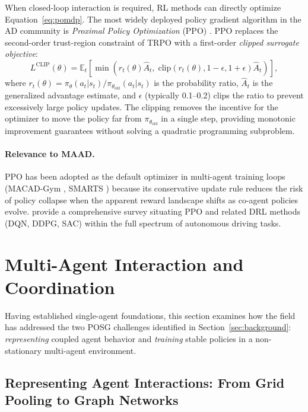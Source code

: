 \documentclass[12pt, a4paper]{article}
\begin{document}
When closed-loop interaction is required, RL methods can directly optimize
Equation~\eqref{eq:pomdp}. The most widely deployed policy gradient algorithm in
the AD community is \emph{Proximal Policy Optimization} (PPO)
\citep{schulman2017proximal}. PPO replaces the second-order trust-region
constraint of TRPO with a first-order \emph{clipped surrogate objective}:
\begin{equation}
  L^{\text{CLIP}}(\theta)
  = \mathbb{E}_t \!\left[
      \min\!\left( r_t(\theta)\hat{A}_t,\;
            \text{clip}(r_t(\theta), 1-\epsilon, 1+\epsilon)\hat{A}_t
      \right)
    \right],
  \label{eq:ppo}
\end{equation}
where $r_t(\theta) = \pi_\theta(a_t|s_t)/\pi_{\theta_{\text{old}}}(a_t|s_t)$ is
the probability ratio, $\hat{A}_t$ is the generalized advantage estimate, and
$\epsilon$ (typically 0.1--0.2) clips the ratio to prevent excessively large
policy updates. The clipping removes the incentive for the optimizer to move the
policy far from $\pi_{\theta_{\text{old}}}$ in a single step, providing
monotonic improvement guarantees without solving a quadratic programming subproblem.

\paragraph{Relevance to MAAD.}
PPO has been adopted as the default optimizer in multi-agent training loops
(MACAD-Gym \citep{palanisamy2020multi}, SMARTS \citep{zhou2020smarts}) because
its conservative update rule reduces the risk of policy collapse when the apparent
reward landscape shifts as co-agent policies evolve. \citet{kiran2021deep} provide
a comprehensive survey situating PPO and related DRL methods (DQN, DDPG, SAC)
within the full spectrum of autonomous driving tasks.

\section{Multi-Agent Interaction and Coordination}
\label{sec:interaction}

Having established single-agent foundations, this section examines how the field
has addressed the two POSG challenges identified in Section~\ref{sec:background}:
\emph{representing} coupled agent behavior and \emph{training} stable policies in
a non-stationary multi-agent environment.

\subsection{Representing Agent Interactions: From Grid Pooling to Graph Networks}
\end{document}
